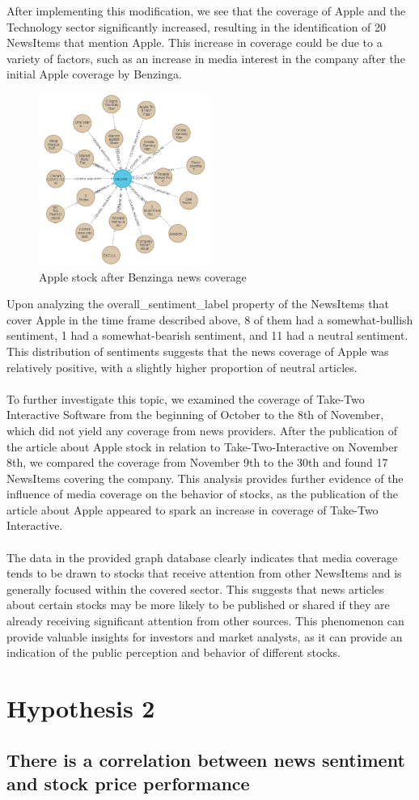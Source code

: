 After implementing this modification, we see that the coverage of Apple and the Technology sector significantly increased, resulting in the identification of 20 NewsItems that mention Apple. This increase in coverage could be due to a variety of factors, such as an increase in media interest in the company after the initial Apple coverage by Benzinga.

\begin{figure}[h]
 \centering
 \includegraphics[width=0.5\textwidth]{images/apple-after-benzinga.png}
 \caption{Apple stock after Benzinga news coverage }
 \label{fig:newsitems-apple-after-benzinga-coverage}
\end{figure}

Upon analyzing the overall\_sentiment\_label property of the NewsItems that cover Apple in the time frame described above, 8 of them had a somewhat-bullish sentiment, 1 had a somewhat-bearish sentiment, and 11 had a neutral sentiment. This distribution of sentiments suggests that the news coverage of Apple was relatively positive, with a slightly higher proportion of neutral articles. \\
\\
To further investigate this topic, we examined the coverage of Take-Two Interactive Software from the beginning of October to the 8th of November, which did not yield any coverage from news providers. After the publication of the article about Apple stock in relation to Take-Two-Interactive on November 8th, we compared the coverage from November 9th to the 30th and found 17 NewsItems covering the company. This analysis provides further evidence of the influence of media coverage on the behavior of stocks, as the publication of the article about Apple appeared to spark an increase in coverage of Take-Two Interactive.\\
\\
The data in the provided graph database clearly indicates that media coverage tends to be drawn to stocks that receive attention from other NewsItems and is generally focused within the covered sector. This suggests that news articles about certain stocks may be more likely to be published or shared if they are already receiving significant attention from other sources. This phenomenon can provide valuable insights for investors and market analysts, as it can provide an indication of the public perception and behavior of different stocks.



\newpage
\section{Hypothesis 2}
\label{cha:hypothesis-2}
\subsection{There is a correlation between news sentiment and stock price performance}
